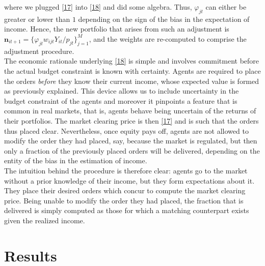 \documentclass[11pt]{article}
\begin{document}
where we plugged \eqref{17} into \eqref{18} and did some algebra. Thus, $\varphi_{jt}$ can either be greater or lower than $1$ depending on the sign of the bias in the expectation of income. Hence, the new portfolio that arises from such an adjustment is $\mathbf{n}_{it+1} = \{ \varphi_{jt} w_{ijt} Y_{it}/p_{jt} \}_{j=1}^M$, and the weights are re-computed to comprise the adjustment procedure.\\
The economic rationale underlying \eqref{18} is simple and involves commitment before the actual budget constraint is known with certainty. Agents are required to place the orders \emph{before} they know their current income, whose expected value is formed as previously explained. This device allows us to include uncertainty in the budget constraint of the agents and moreover it pinpoints a feature that is common in real markets, that is, agents behave being uncertain of the returns of their portfolios. The market clearing price is then \eqref{17} and is such that the orders thus placed clear. Nevertheless, once equity pays off, agents are not allowed to modify the order they had placed, say, because the market is regulated, but then only a fraction of the previously placed orders will be delivered, depending on the entity of the bias in the estimation of income. \\The intuition behind the procedure is therefore clear: agents go to the market without a prior knowledge of their income, but they form expectations about it. They place their desired orders which concur to compute the market clearing price. Being unable to modify the order they had placed, the fraction that is delivered is simply computed as those for which a matching counterpart exists given the realized income.
%
%
\section{Results}\label{section3}
\end{document}
